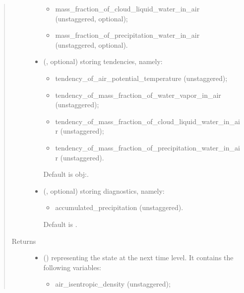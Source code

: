 \documentclass[letterpaper,10pt,english]{sphinxmanual}
\begin{document}
\begin{fulllineitems}
\begin{fulllineitems}
\begin{quote}
\begin{description}
\begin{itemize}
\begin{itemize}
\item {} 
mass\_fraction\_of\_cloud\_liquid\_water\_in\_air (unstaggered, optional);

\item {} 
mass\_fraction\_of\_precipitation\_water\_in\_air (unstaggered, optional).

\end{itemize}


\item {} 
 (, optional) \textendash{} 
{\hyperref[\detokenize{api:tasmania.storages.grid_data.GridData}]{}} storing tendencies, namely:
\begin{itemize}
\item {} 
tendency\_of\_air\_potential\_temperature (unstaggered);

\item {} 
tendency\_of\_mass\_fraction\_of\_water\_vapor\_in\_air (unstaggered);

\item {} 
tendency\_of\_mass\_fraction\_of\_cloud\_liquid\_water\_in\_air (unstaggered);

\item {} 
tendency\_of\_mass\_fraction\_of\_precipitation\_water\_in\_air (unstaggered).

\end{itemize}

Default is obj:.


\item {} 
 (, optional) \textendash{} 
{\hyperref[\detokenize{api:tasmania.storages.grid_data.GridData}]{}} storing diagnostics, namely:
\begin{itemize}
\item {} 
accumulated\_precipitation (unstaggered).

\end{itemize}

Default is .


\end{itemize}

\item[{Returns}] \leavevmode
\begin{itemize}
\item {} 
 () \textendash{} {\hyperref[\detokenize{api:tasmania.storages.state_isentropic.StateIsentropic}]{}} representing the state at the next time level.
It contains the following variables:
\begin{itemize}
\item {} 
air\_isentropic\_density (unstaggered);


\end{itemize}
\end{itemize}
\end{description}
\end{quote}
\end{fulllineitems}
\end{fulllineitems}
\end{document}

